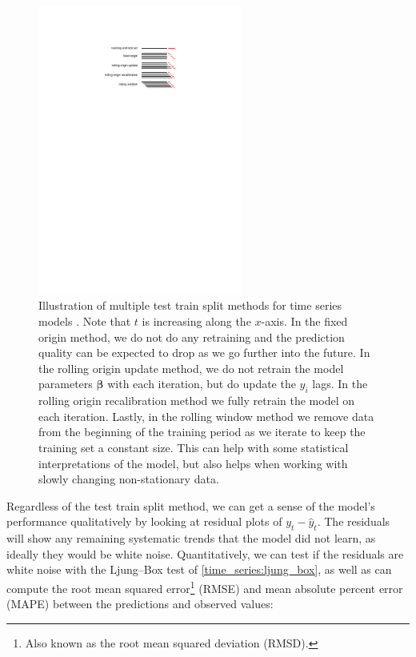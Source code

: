 \begin{figure}
\centering
\includegraphics[width=0.6\textwidth]{figures/stats/rolling_forecast_origin}
\caption{
Illustration of multiple test train split methods for time series models \cite{bergmeir_dissertation}.
Note that $t$ is increasing along the $x$-axis.
In the fixed origin method, we do not do any retraining and the prediction quality
can be expected to drop as we go further into the future.
In the rolling origin update method, we do not retrain the model parameters $\bm{\beta}$
with each iteration, but do update the $y_{i}$ lags.
In the rolling origin recalibration method we fully retrain the model on each iteration.
Lastly, in the rolling window method we remove data from the beginning of the training period
as we iterate to keep the training set a constant size.
This can help with some statistical interpretations of the model,
but also helps when working with slowly changing non-stationary data.
}
\label{fig:rolling_forecast_origin}
\end{figure}

Regardless of the test train split method, we can get a sense of the model's performance
qualitatively by looking at residual plots of $y_{t} - \hat{y}_{t}$.
The residuals will show any remaining systematic trends that the model did not learn,
as ideally they would be white noise.
Quantitatively, we can test
if the residuals are white noise with the Ljung--Box test of \cref{time_series:ljung_box},
as well as can compute the
root mean squared error\footnote{Also known as the root mean squared deviation (RMSD).} (RMSE)
and mean absolute percent error (MAPE)
between the predictions and observed values:

